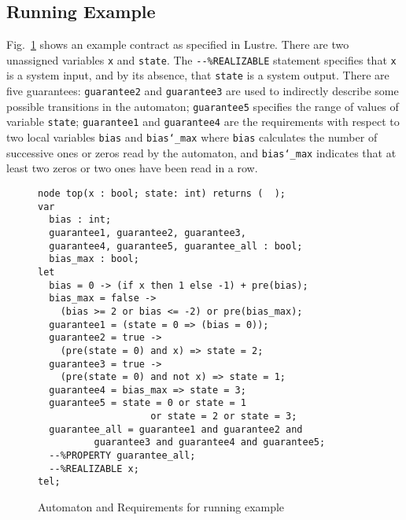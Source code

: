 \subsection{Running Example}
\label{sec:example}

Fig.~\ref{fg:example} shows an example contract as specified in
Lustre. There are two unassigned variables \texttt{x} and
\texttt{state}. The \texttt{{-}{-}\%REALIZABLE} statement specifies
that \texttt{x} is a system input, and by its absence, that
\texttt{state} is a system output. There are five guarantees:
\texttt{guarantee2} and \texttt{guarantee3} are used to indirectly
describe some possible transitions in the automaton;
\texttt{guarantee5} specifies the range of
values of variable \texttt{state};
\texttt{guarantee1} and \texttt{guarantee4} are the requirements with respect to
two local variables \texttt{bias} and \texttt{bias\char`_max} where
 \texttt{bias} calculates the number of successive ones or
zeros read by the automaton, and \texttt{bias\char`_max} indicates that at least two zeros or two ones have been read
in a row.

\begin{figure}[tb]
\centering
{}
\begin{minipage}[c]{0.6\textwidth}
 \begin{Verbatim}[fontsize=\scriptsize]
node top(x : bool; state: int) returns (  );
var
  bias : int;
  guarantee1, guarantee2, guarantee3,
  guarantee4, guarantee5, guarantee_all : bool;
  bias_max : bool;
let
  bias = 0 -> (if x then 1 else -1) + pre(bias);
  bias_max = false ->
	(bias >= 2 or bias <= -2) or pre(bias_max);
  guarantee1 = (state = 0 => (bias = 0));
  guarantee2 = true ->
  	(pre(state = 0) and x) => state = 2;
  guarantee3 = true ->
  	(pre(state = 0) and not x) => state = 1;
  guarantee4 = bias_max => state = 3;
  guarantee5 = state = 0 or state = 1 
                    or state = 2 or state = 3;
  guarantee_all = guarantee1 and guarantee2 and
          guarantee3 and guarantee4 and guarantee5;
  --%PROPERTY guarantee_all;
  --%REALIZABLE x;
tel;
 \end{Verbatim}
\end{minipage}
\vspace{-0.5em}
\caption{Automaton and Requirements for running example}
\vspace{-2.5em}
\label{fg:example}
\end{figure}

